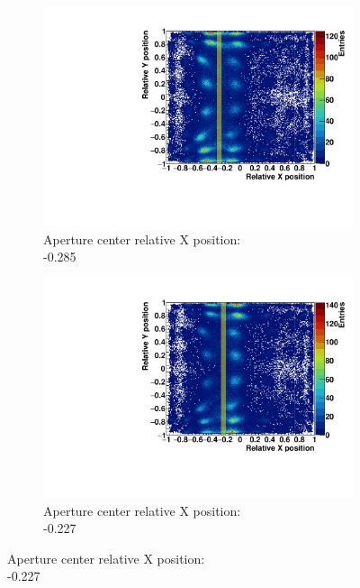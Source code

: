 \begin{figure}
\begin{subfigure}[t]{0.32\textwidth}
\centering
\includegraphics[width=\textwidth]{03_GraphicFiles/chapter3_CLaRySproto/Absorber/images_scan/line_1mm/run00016_floodMap.pdf}
\caption{Aperture center relative X position: \\ -0.285}
\label{chap3::fig::scan_map3_1mm}
\end{subfigure}
\newline
\begin{subfigure}[t]{0.32\textwidth}
\centering
\includegraphics[width=\textwidth]{03_GraphicFiles/chapter3_CLaRySproto/Absorber/images_scan/line_1mm/run00017_floodMap.pdf}
\caption{Aperture center relative X position: \\ -0.227}
\label{chap3::fig::scan_map4_1mm}
\end{subfigure}

\end{figure}
